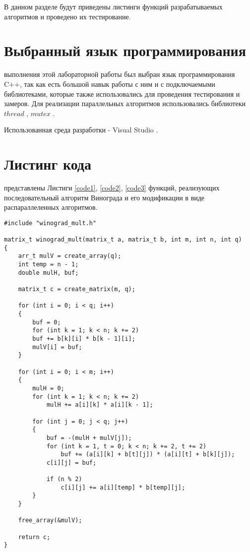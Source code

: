 В данном разделе будут приведены листинги функций разрабатываемых алгоритмов и проведено их тестирование.

\section{Выбранный язык программирования}
 выполнения этой лабораторной работы был выбран язык программирования C++, так как есть большой навык работы с ним и с подключаемыми библиотеками, которые также использовались для проведения тестирования и замеров. Для реализации параллельных алгоритмов использовались библиотеки $thread$ \cite{thread}, $mutex$ \cite{mutex}. 

Использованная среда разработки - Visual Studio \cite{Visual}.

\section{Листинг кода}
 представлены Листиги \ref{code1}, \ref{code2}, \ref{code3} функций, реализующих последовательный алгоритм Винограда и его модификации в виде распараллеленных алгоритмов.\\

\begin{lstlisting}[label=code1, caption = Последовательный алгоритм Винограда, captionpos=b]
#include "winograd_mult.h"

matrix_t winograd_mult(matrix_t a, matrix_t b, int m, int n, int q)
{
	arr_t mulV = create_array(q);
	int temp = n - 1;
	double mulH, buf;
	
	matrix_t c = create_matrix(m, q);
	
	for (int i = 0; i < q; i++)
	{
		buf = 0;
		for (int k = 1; k < n; k += 2)
		buf += b[k][i] * b[k - 1][i];
		mulV[i] = buf;
	}
	
	for (int i = 0; i < m; i++)
	{
		mulH = 0;
		for (int k = 1; k < n; k += 2)
			mulH += a[i][k] * a[i][k - 1];
		
		for (int j = 0; j < q; j++)
		{
			buf = -(mulH + mulV[j]);
			for (int k = 1, t = 0; k < n; k += 2, t += 2)
				buf += (a[i][k] + b[t][j]) * (a[i][t] + b[k][j]);
			c[i][j] = buf;
			
			if (n % 2)
				c[i][j] += a[i][temp] * b[temp][j];
		}
	}
	
	free_array(&mulV);
	
	return c;
}
\end{lstlisting}

